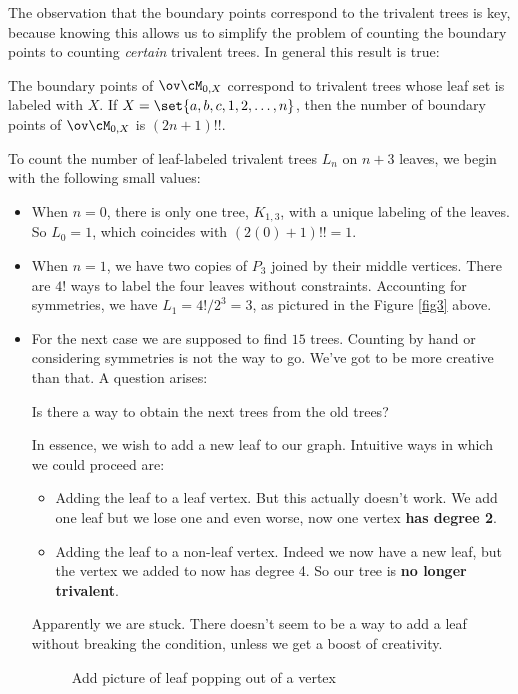 \documentclass[12pt]{memoir}
\begin{document}
The observation that the boundary points correspond to the trivalent trees is key, because knowing this allows us to simplify the problem of counting the boundary points to counting \emph{certain} trivalent trees. In general this result is true:

\begin{Prop}
    The boundary points of $\ov\cM_{0,X}$ correspond to trivalent trees whose leaf set is labeled with $X$. If $X=\set{a,b,c,1,2,\dots,n}$, then the number of boundary points of $\ov\cM_{0,X}$ is $(2n+1)!!$. 
\end{Prop}

To count the number of leaf-labeled trivalent trees $L_n$ on $n+3$ leaves, we begin with the following small values:
\begin{itemize}
    \item When $n=0$, there is only one tree, $K_{1,3}$, with a unique labeling of the leaves. So $L_0=1$, which coincides with $(2(0)+1)!!=1$.
    \item When $n=1$, we have two copies of $P_3$ joined by their middle vertices. There are $4!$ ways to label the four leaves without constraints. Accounting for symmetries, we have $L_1=4!/2^3=3$, as pictured in the Figure \ref{fig3} above.
    \item For the next case we are supposed to find $15$ trees. Counting by hand or considering symmetries is not the way to go. We've got to be more creative than that. A question arises:
    \begin{significant}
        Is there a way to obtain the next trees from the old trees?
    \end{significant}
    In essence, we wish to add a new leaf to our graph. Intuitive ways in which we could proceed are:
    \begin{itemize}
        \item Adding the leaf to a leaf vertex. But this actually doesn't work. We add one leaf but we lose one and even worse, now one vertex \textbf{has degree 2}.
        \item Adding the leaf to a non-leaf vertex. Indeed we now have a new leaf, but the vertex we added to now has degree 4. So our tree is \textbf{no longer trivalent}.
    \end{itemize}
    Apparently we are stuck. There doesn't seem to be a way to add a leaf without breaking the condition, unless we get a boost of creativity. 
    \begin{figure}[h!]
        \centering
        Add picture of leaf popping out of a vertex

\end{figure}
\end{itemize}
\end{document}

